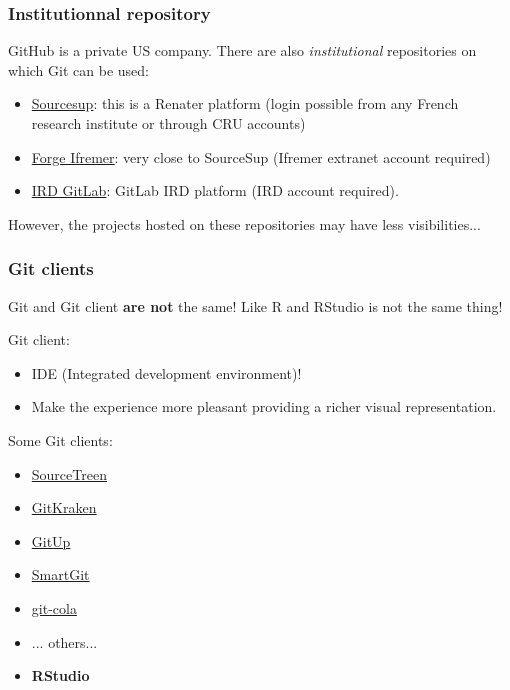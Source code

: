\documentclass[svgnames]{beamer}
\begin{document}
\begin{frame}
    \frametitle{Institutionnal repository}

    GitHub is a private US company. There are also \emph{institutional} repositories on which Git can be used:

    \begin{itemize}
        \item{\href{https://sourcesup.renater.fr/}{Sourcesup}: this is a Renater platform (login possible from any French research institute or through CRU accounts)}
        \item{\href{https://forge.ifremer.fr/}{Forge Ifremer}: very close to SourceSup (Ifremer extranet account required)}
        \item{\href{gitlab.intranet.ird.fr}{IRD GitLab}: GitLab IRD platform (IRD account required).}
    \end{itemize}

    However, the projects hosted on these repositories may have less visibilities...

\end{frame}


\begin{frame}
    \frametitle{Git clients}

    Git and Git client \textbf{are not} the same! Like R and RStudio is not the same thing!
    \hfill \break

    Git client:
    \begin{itemize}
        \item IDE (Integrated development environment)!
        \item Make the experience more pleasant providing a richer visual representation.
    \end{itemize}

    \hfill 

    Some Git clients:
    \begin{itemize}
        \item \href{https://www.sourcetreeapp.com/}{\faStar SourceTreen} 
        \item \href{https://www.gitkraken.com/}{\faStar GitKraken}
        \item \href{https://gitup.co/}{\faStar GitUp} 
        \item \href{https://www.syntevo.com/smartgit/}{\faStar SmartGit} 
        \item \href{https://git-cola.github.io/}{\faStar git-cola} 
        \item ... others... 
        \item \textbf{RStudio} 
    \end{itemize}
\end{frame}
\end{document}
